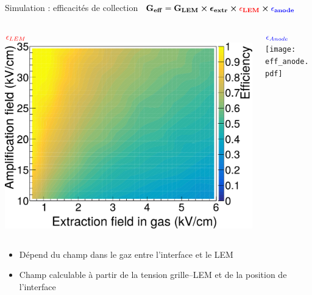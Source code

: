     \begin{frame}{Simulation : efficacités de collection}
        \hbox{
        		$\mathbf{G_{eff}=G_{LEM}\boldsymbol{\times}\boldsymbol{\epsilon}_{extr} \boldsymbol{\times}\textcolor{red}{\epsilon_{LEM}}\boldsymbol{\times} \textcolor{blue}{\epsilon_{anode}}}$
        	}\vspace{0.2cm}
      		\begin{columns}
            \begin{column}{0.5\textwidth}
                \centering $\textcolor{red}{\epsilon_{LEM}}$
                \includegraphics[width=\textwidth]{./pictures/eff_lem_alone.pdf}
            \end{column}\hfill
            \begin{column}{0.5\textwidth}
                \centering $\textcolor{blue}{\epsilon_{Anode}}$
                \texttt{[image: eff\_anode.pdf]}
            \end{column}
        \end{columns}
      		\begin{columns}
            \begin{column}{0.5\textwidth}
                \begin{scriptsize}
                    \begin{itemize}
                        \item Dépend du champ dans le gaz entre l'interface et le LEM
                        \item Champ calculable à partir de la tension grille--LEM et de la position de l'interface
                    \end{itemize}

\end{scriptsize}
\end{column}
\end{columns}
\end{frame}
